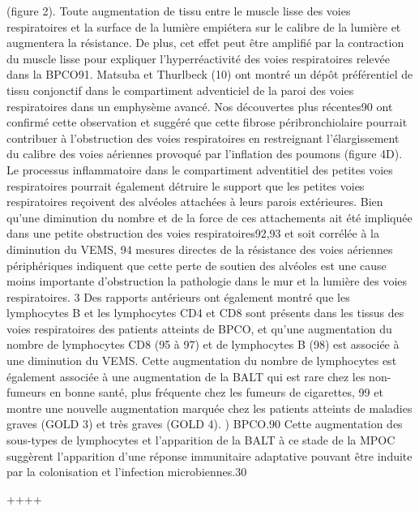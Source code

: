 \documentclass[12pt,]{article}
\begin{document}
(figure 2). Toute augmentation de tissu entre le muscle lisse des voies
respiratoires et la surface de la lumière empiétera sur le calibre de la
lumière et augmentera la résistance. De plus, cet effet peut être
amplifié par la contraction du muscle lisse pour expliquer
l'hyperréactivité des voies respiratoires relevée dans la BPCO91.
Matsuba et Thurlbeck (10) ont montré un dépôt préférentiel de tissu
conjonctif dans le compartiment adventiciel de la paroi des voies
respiratoires dans un emphysème avancé. Nos découvertes plus récentes90
ont confirmé cette observation et suggéré que cette fibrose
péribronchiolaire pourrait contribuer à l'obstruction des voies
respiratoires en restreignant l'élargissement du calibre des voies
aériennes provoqué par l'inflation des poumons (figure 4D). Le processus
inflammatoire dans le compartiment adventitiel des petites voies
respiratoires pourrait également détruire le support que les petites
voies respiratoires reçoivent des alvéoles attachées à leurs parois
extérieures. Bien qu'une diminution du nombre et de la force de ces
attachements ait été impliquée dans une petite obstruction des voies
respiratoires92,93 et soit corrélée à la diminution du VEMS, 94 mesures
directes de la résistance des voies aériennes périphériques indiquent
que cette perte de soutien des alvéoles est une cause moins importante
d'obstruction la pathologie dans le mur et la lumière des voies
respiratoires. 3 Des rapports antérieurs ont également montré que les
lymphocytes B et les lymphocytes CD4 et CD8 sont présents dans les
tissus des voies respiratoires des patients atteints de BPCO, et qu'une
augmentation du nombre de lymphocytes CD8 (95 à 97) et de lymphocytes B
(98) est associée à une diminution du VEMS. Cette augmentation du nombre
de lymphocytes est également associée à une augmentation de la BALT qui
est rare chez les non-fumeurs en bonne santé, plus fréquente chez les
fumeurs de cigarettes, 99 et montre une nouvelle augmentation marquée
chez les patients atteints de maladies graves (GOLD 3) et très graves
(GOLD 4). ) BPCO.90 Cette augmentation des sous-types de lymphocytes et
l'apparition de la BALT à ce stade de la MPOC suggèrent l'apparition
d'une réponse immunitaire adaptative pouvant être induite par la
colonisation et l'infection microbiennes.30

++++
\end{document}
